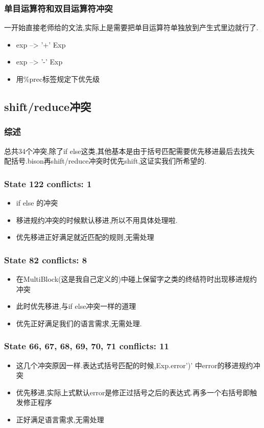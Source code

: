 \documentclass[11pt]{article}
\begin{document}
\subsubsection{单目运算符和双目运算符冲突}
\label{sec-2-1-1}
一开始直接老师给的文法,实际上是需要把单目运算符单独放到产生式里边就行了.
\begin{itemize}
\item exp --> '+' Exp
\item exp --> '-' Exp
\item 用\%prec标签规定下优先级
\end{itemize}
\subsection{shift/reduce冲突}
\label{sec-2-2}
\subsubsection{综述}
\label{sec-2-2-1}
总共34个冲突,除了if else这类,其他基本是由于括号匹配需要优先移进最后去找失配括号.bison再shift/reduce冲突时优先shift,这证实我们所希望的.
\subsubsection{State 122 conflicts: 1}
\label{sec-2-2-2}
\begin{itemize}
\item if else 的冲突
\item 移进规约冲突的时候默认移进,所以不用具体处理啦.
\item 优先移进正好满足就近匹配的规则,无需处理
\end{itemize}
\subsubsection{State 82 conflicts: 8}
\label{sec-2-2-3}
\begin{itemize}
\item 在MultiBlock(这是我自己定义的)中碰上保留字之类的终结符时出现移进规约冲突
\item 此时优先移进,与if else冲突一样的道理
\item 优先正好满足我们的语言需求,无需处理.
\end{itemize}
\subsubsection{State 66, 67, 68, 69, 70, 71 conflicts: 11}
\label{sec-2-2-4}
\begin{itemize}
\item 这几个冲突原因一样.表达式括号匹配的时候,Exp.error')' 中error的移进规约冲突
\item 优先移进,实际上式默认error是修正过括号之后的表达式.再多一个右括号即触发修正程序
\item 正好满足语言需求,无需处理
\end{itemize}
\end{document}
